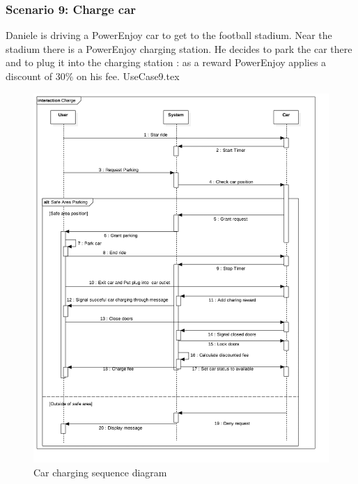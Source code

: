 \documentclass[12pt]{article}
\begin{document}
		\subsubsection{Scenario 9: Charge car}
		Daniele is driving a PowerEnjoy car to get to the football stadium. Near the stadium there is a 
		PowerEnjoy charging station. He decides to park the car there and to plug it into the 
		charging station : as a reward PowerEnjoy applies a discount of 30\% on his fee.
		\FloatBarrier
		{UseCase9.tex}
		\newpage
		\begin{figure}[htbp]
		\caption{Car charging sequence diagram}
		\includegraphics[scale=0.49]{Images/SequenceDiagram/Charge.png}
 	 	\end{figure}
 	 	\clearpage
		
		
\end{document}
